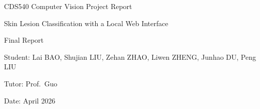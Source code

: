 \documentclass[11pt,a4paper]{article}
\begin{document}
\begin{center}
{\Large CDS540 Computer Vision Project Report\par}
\vspace{0.35cm}
{\LARGE Skin Lesion Classification with a Local Web Interface\par}
\vspace{0.25cm}
{\large Final Report\par}
\end{center}
\vspace{0.3cm}
\begin{flushleft}
{\normalsize
Student: Lai BAO, Shujian LIU, Zehan ZHAO, Liwen ZHENG, Junhao DU, Peng LIU\par
Tutor: Prof.\ Guo\par
Date: April 2026\par
}
\end{flushleft}
\vspace{0.6cm}

\begin{abstract}
This report presents a seven-class skin lesion classification system based on the HAM10000 dermoscopic image collection. The project combines grouped train--test preparation, a ResNet18 classifier with a squeeze-and-excitation style attention block, and a FastAPI interface for local inference. Images are reorganized from the metadata file into class folders, split by lesion identifier to reduce leakage, resized to \(224\times224\), normalized with ImageNet statistics, and augmented during training. The deployed interface supports upload, health checks, and local prediction history stored in SQLite. On the current grouped test set of 2{,}004 images, the provided model weights reach 0.92 accuracy, 0.87 macro F1, and 0.92 weighted F1. The report summarizes the system design, dataset preparation, exploratory analysis, evaluation results, and main limitations.
\end{abstract}













\end{document}
